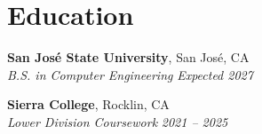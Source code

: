 \section{Education}

\noindent
\textbf{San José State University}, San José, CA \\
\textit{B.S. in Computer Engineering} \hfill \textit{Expected 2027}

\vspace{0.2cm}
\noindent
\textbf{Sierra College}, Rocklin, CA \\
\textit{Lower Division Coursework}
\hfill \textit{2021 -- 2025}


